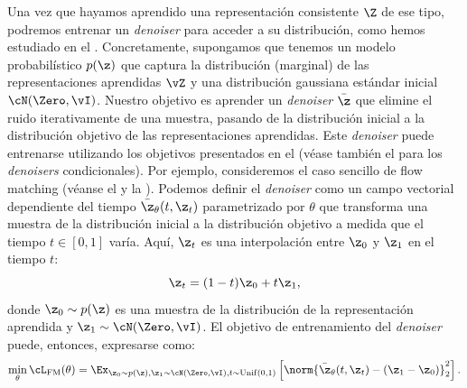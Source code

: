 \documentclass[../../book-main_es.tex]{subfiles}
\begin{document}
Una vez que hayamos aprendido una representación consistente $\Z$ de ese tipo, podremos entrenar
un \textit{denoiser} para acceder a su distribución, como hemos estudiado en el
. Concretamente, supongamos que tenemos un modelo probabilístico $p(\z)$
que captura la distribución (marginal) de las representaciones aprendidas $\vZ$ y una
distribución gaussiana estándar inicial $\cN(\Zero, \vI)$. Nuestro objetivo es aprender
un \textit{denoiser} $\bar{\z}$ que elimine el ruido iterativamente de una muestra, pasando de la
distribución inicial a la distribución objetivo de las representaciones aprendidas.
Este \textit{denoiser} puede entrenarse utilizando los objetivos presentados en el 
(véase también el  para los \textit{denoisers} condicionales). Por
ejemplo, consideremos el caso sencillo de flow matching (véanse el
     y la
). Podemos definir el \textit{denoiser} como un
campo vectorial dependiente del tiempo $\bar{\z}_{\theta}(t, \z_t)$
parametrizado por $\theta$ que transforma una muestra de la distribución inicial
a la distribución objetivo a medida que el tiempo $t \in [0, 1]$ varía.
Aquí, $\z_t$ es una interpolación entre $\z_0$ y $\z_1$ en el tiempo $t$:
\begin{equation}
    \z_t = (1 - t)\z_0 + t\z_1,
\end{equation}
donde $\z_0 \sim p(\z)$ es una muestra de la distribución de la representación aprendida
y $\z_1 \sim \cN(\Zero, \vI)$.
El objetivo de entrenamiento del \textit{denoiser} puede, entonces, expresarse como:
\begin{equation}
    \min_{\theta} \cL_{\mathrm{FM}}(\theta) = \Ex_{\z_0 \sim p(\z), \z_1 \sim
    \cN(\Zero, \vI), t \sim \mathrm{Unif}(0, 1)} \left[
    \norm{\bar{\z}_{\theta}(t,\z_t) - (\z_1 - \z_0)}_2^2 \right].
\end{equation}

\end{document}
